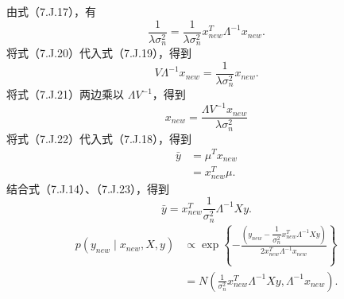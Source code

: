 由式（7.J.17），有
\begin{equation}
\frac1{\lambda\sigma_n^2}
 =\frac1{\lambda\sigma_n^2}x_{new}^T\Lambda^{-1}x_{new}.\tag{7.J.20}
\end{equation}
将式（7.J.20）代入式（7.J.19），得到
\begin{equation}
V\Lambda^{-1}x_{new}=\frac1{\lambda\sigma_n^2}x_{new}.\tag{7.J.21}
\end{equation}
将式（7.J.21）两边乘以 $\Lambda V^{-1}$，得到
\begin{equation}
x_{new}=\frac{\Lambda V^{-1}x_{new}}{\lambda\sigma_n^2}\tag{7.3A22}
\end{equation}
将式（7.J.22）代入式（7.J.18），得到
\begin{equation}
\begin{aligned}
\bar y&=\mu^Tx_{new}\\
 &=x_{new}^T\mu.
\end{aligned}\tag{7.J.23}
\end{equation}
结合式（7.J.14）、（7.J.23），得到
\begin{equation}
\bar y=x_{new}^T\frac1{\sigma_n^2}\Lambda^{-1}Xy.\tag{7.J.24}
\end{equation}
\begin{equation}
\begin{aligned}
p(y_{new}\mid x_{new},X,y)
 &\propto\exp\left\{-\frac{\left(y_{new}-\dfrac1{\sigma_n^2}x_{new}^T\Lambda^{-1}Xy\right)}
 {2x_{new}^T\Lambda^{-1}x_{new}}\right\}\\
 &=N\left(\frac1{\sigma_n^2}x_{new}^T\Lambda^{-1}Xy,\Lambda^{-1}x_{new}\right).
\end{aligned}\tag{7.J.25}
\end{equation}
